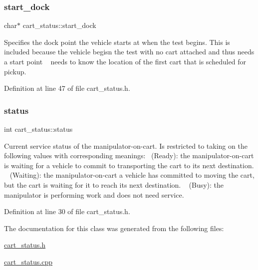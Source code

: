 \subsubsection{\texorpdfstring{start\+\_\+dock}{start\_dock}}
{\footnotesize\ttfamily char$\ast$ cart\+\_\+status\+::start\+\_\+dock\hspace{0.3cm}{\ttfamily [private]}}

Specifies the dock point the vehicle starts at when the test begins. This is included because the vehicle begisn the test with no cart attached and thus needs a start point ~\newline
needs to know the location of the first cart that is scheduled for pickup. 

Definition at line 47 of file cart\+\_\+status.\+h.

\mbox{\label{classcart__status_a641a53bcd134b03c70ddbad2309f3e1c}} 
\subsubsection{\texorpdfstring{status}{status}}
{\footnotesize\ttfamily int cart\+\_\+status\+::status\hspace{0.3cm}{\ttfamily [private]}}

Current service status of the manipulator-\/on-\/cart. Is restricted to taking on the following values with corresponding meanings\+:~ (Ready)\+: the manipulator-\/on-\/cart is waiting for a vehicle to commit to transporting the cart to its next destination. ~ (Waiting)\+: the manipulator-\/on-\/cart a vehicle has committed to moving the cart, but the cart is waiting for it to reach its next destination. ~ (Busy)\+: the manipulator is performing work and does not need service. 

Definition at line 30 of file cart\+\_\+status.\+h.



The documentation for this class was generated from the following files\+:\begin{DoxyCompactItemize}
\item 
\mbox{\hyperlink{cart__status_8h}{cart\+\_\+status.\+h}}\item 
\mbox{\hyperlink{cart__status_8cpp}{cart\+\_\+status.\+cpp}}\end{DoxyCompactItemize}
